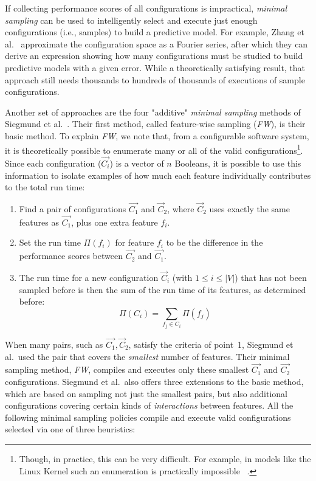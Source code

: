  If collecting performance scores of all configurations is impractical,  {\em minimal sampling} 
 can be used to intelligently select and execute just enough configurations (i.e., samples) to build a
 predictive model.
 For example, Zhang et al.~\cite{zhang2015performance} approximate the
configuration space as a Fourier series, after which they can derive an expression showing how many configurations must be studied
 to build predictive models with a given error. While a theoretically satisfying result, that approach still needs thousands to hundreds of thousands of executions of sample
 configurations.  

Another set of approaches are the four "additive" {\em minimal sampling} methods of Siegmund et al.~\cite{siegmund2012predicting}.
Their first method, called feature-wise sampling ({\em FW}), is their basic method.
To explain {\em FW}, we note that, from a configurable software system, it is theoretically possible to enumerate many or all of the valid configurations\footnote{Though, in practice, this can be very difficult. For example, in models like the Linux Kernel such an enumeration is practically impossible ~\cite{sayyad13b}.}. 
Since each configuration ($\vec{C_i}$) is a vector of $n$ Booleans, it  is possible to use this information to isolate examples of how much each feature individually contributes to the total run time:
\begin{enumerate}
\item Find a pair of  configurations $\vec{C_1}$ and $\vec{C}_2$, where $\vec{C}_2$ uses exactly the same features as $\vec{C_1}$, plus one  extra feature $f_i$.
\item Set the run time $\Pi(f_i)$ for feature $f_i$ to be the difference in the performance scores between $\vec{C_2}$ and $\vec{C_1}$.
\item The run time  for a new configuration  $\vec{C}_i$ (with $1\leq i\leq \left\vert{V}\right\vert$) that has not been sampled before is then the sum of the run time of its features, as determined before:
\begin{equation}
  \Pi(C_i) = \sum_{f_j \in C_i}\Pi(f_j)  
\end{equation}
\end{enumerate}

When many pairs, such as ${\vec{C_1},\vec{C}_2}$, satisfy the criteria of point~1, Siegmund et al.\ used the 
pair that covers the {\em smallest} number of features. Their minimal sampling method, {\em FW},
compiles and executes only these smallest ${\vec{C_1}}$ and ${\vec{C_2}}$ configurations. 
Siegmund et al.\ also offers three extensions to the basic method, which are based on sampling
not just the smallest  pairs, but also additional configurations covering certain kinds of {\em interactions} between features. 
All the following minimal sampling policies compile and   execute valid configurations selected via one of three heuristics:

